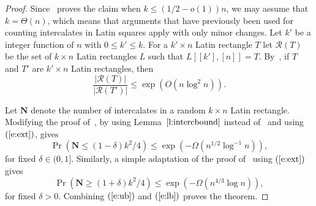 \documentclass[12pt]{article}
\theoremstyle{definition}
\numberwithin{equation}{section}
\def\eref#1{$(\ref{#1})$}
\def\lref#1{Lemma~$\ref{#1}$}
\renewcommand{\geq}{\geqslant}
\renewcommand{\leq}{\leqslant}
\begin{document}
\begin{proof}
  Since~\cite[Corollary $1.7$]{subsqrandom} proves the claim when
  $k\leq (1/2-o(1))n$, we may assume that $k = \Theta(n)$, which means
  that arguments that have previously been used for counting intercalates in
  Latin squares apply with only minor changes. Let $k'$ be a
  integer function of $n$ with $0\leq k'\leq k$. For a $k' \times n$
  Latin rectangle $T$ let $\mathcal{R}(T)$ be the set of $k \times n$
  Latin rectangles $L$ such that $L[[k'], [n]] = T$.
  By~\cite[Proposition~$4$]{manysubsq}, if $T$ and $T'$ are $k'\times n$
  Latin rectangles, then
  \begin{equation}\label{e:ext}
    \frac{|\mathcal{R}(T)|}{|\mathcal{R}(T')|} \leq \exp(O(n\log^2n)).
  \end{equation}
  
  Let $\mathbf{N}$ denote the number of intercalates in a random $k
  \times n$ Latin rectangle. Modifying the proof
  of~\cite[Theorem $4$]{KS}, by using \lref{l:intercbound}
  instead of~\cite[Theorem $3$]{KS} and using \eref{e:ext}, gives
  \begin{equation}\label{e:ub}
    \Pr(\mathbf{N} \leq (1-\delta)k^2/4) \leq \exp(-\Omega(n^{1/2} \log^{-1} n)),
  \end{equation}
  for fixed $\delta \in (0, 1]$. Similarly, a simple adaptation of the proof
    of~\cite[Theorem $2.1$]{KSSS} using \eref{e:ext} gives
    \begin{equation}\label{e:lb}
      \Pr(\mathbf{N} \geq (1+\delta)k^2/4) \leq \exp(-\Omega(n^{4/3}\log n)),
    \end{equation}
    for fixed $\delta > 0$.
    Combining \eref{e:ub} and \eref{e:lb} proves the theorem.
\end{proof}
	
\printbibliography
	
\end{document}
